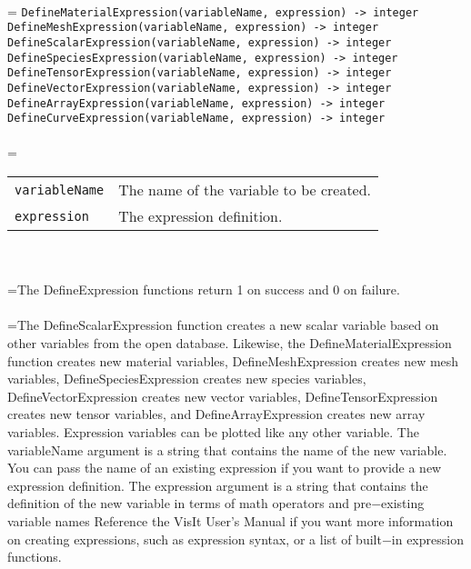 \documentclass[10pt,a4paper]{report}
\begin{document}
 \\ 
\hangindent=\parindent 
\verb!DefineMaterialExpression(variableName, expression) -> integer!\\ 
\verb!DefineMeshExpression(variableName, expression) -> integer!\\ 
\verb!DefineScalarExpression(variableName, expression) -> integer!\\ 
\verb!DefineSpeciesExpression(variableName, expression) -> integer!\\ 
\verb!DefineTensorExpression(variableName, expression) -> integer!\\ 
\verb!DefineVectorExpression(variableName, expression) -> integer!\\ 
\verb!DefineArrayExpression(variableName, expression) -> integer!\\ 
\verb!DefineCurveExpression(variableName, expression) -> integer!\\ [-3mm]

 \\ 
\hangindent=\parindent 
\begin{tabular}{ll}
\verb!variableName! & The name of the variable to be created. \\
\verb!expression! & The expression definition. \\
\end{tabular} \\[-2mm]


 \\ 
\hangindent=\parindent The DefineExpression functions return 1 on success and 0 on failure. \\[-3mm] 

 \\ 
\hangindent=\parindent The DefineScalarExpression function creates a new scalar variable based on other variables from the open database. Likewise, the DefineMaterialExpression function creates new material variables, DefineMeshExpression creates new mesh variables, DefineSpeciesExpression creates new species variables, DefineVectorExpression creates new vector variables, DefineTensorExpression creates new tensor variables, and DefineArrayExpression creates new array variables. Expression variables can be plotted like any other variable. The variableName argument is a string that contains the name of the new variable. You can pass the name of an existing expression if you want to provide a new expression definition. The expression argument is a string that contains the definition of the new variable in terms of math operators and pre$-$existing variable names Reference the VisIt User's Manual if you want more information on  creating expressions, such as expression syntax, or a list of built$-$in expression functions. \\[-3mm] 
\end{document}
